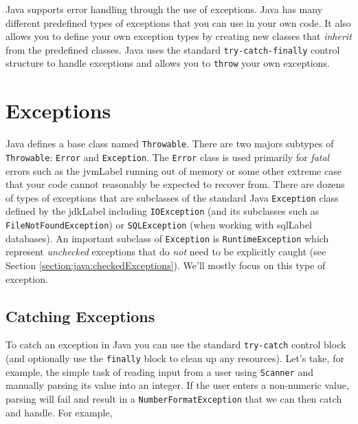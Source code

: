 

Java supports error handling through the use of exceptions.
Java has many different predefined types of exceptions that
you can use in your own code.  It also allows you to
define your own exception types by creating new classes
that \emph{inherit} from the predefined classes.  Java uses
the standard \texttt{try-catch-finally} control structure
to handle exceptions and allows you to \texttt{throw}
your own exceptions.

\section{Exceptions}

Java defines a base class named \texttt{Throwable}.  
There are two majors subtypes of
\texttt{Throwable}: \texttt{Error} and 
\texttt{Exception}.  The \texttt{Error} class
is used primarily for \emph{fatal} errors such as the \gls{jvmLabel}
running out of memory or some other extreme case that your
code cannot reasonably be expected to recover from.  
There are dozens of types of exceptions that are subclasses
of the standard Java \texttt{Exception} class defined by
the \gls{jdkLabel} including \texttt{IOException} 
(and its subclasses such as \texttt{FileNotFoundException})
or \texttt{SQLException} (when working with \gls{sqlLabel}
databases). An important subclass of \texttt{Exception} is 
\texttt{RuntimeException} which represent \emph{unchecked}
exceptions that do \emph{not} need to be explicitly caught
(see Section \ref{section:java:checkedExceptions}).  We'll mostly 
focus on this type of exception.

\subsection{Catching Exceptions}

To catch an exception in Java you can use the standard
\texttt{try-catch} control block (and optionally
use the \texttt{finally} block to clean up any
resources).  Let's take, for example, the simple task of
reading input from a user using \texttt{Scanner}
and manually parsing its value into an integer.  If the
user enters a non-numeric value, parsing will fail
and result in a \texttt{NumberFormatException}
that we can then catch and handle. For example, 

